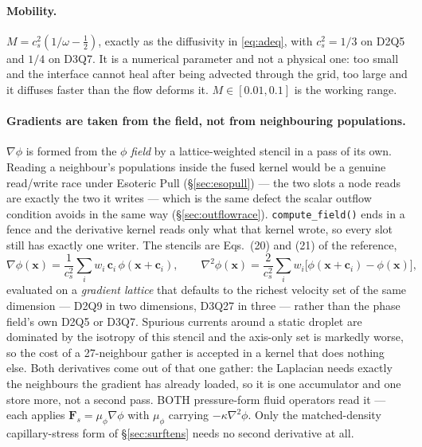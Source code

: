 \documentclass[11pt,a4paper]{article}
\newcommand{\code}[1]{\texttt{\small #1}}
\newcommand{\cs}{c_s}
\newcommand{\ci}{\bm{c}_i}
\newcommand{\xx}{\bm{x}}
\begin{document}
\paragraph{Mobility.} $M = \cs^2(1/\omega - \tfrac12)$, exactly as the
diffusivity in \eqref{eq:adeq}, with $\cs^2 = 1/3$ on D2Q5 and $1/4$ on D3Q7. It
is a numerical parameter and not a physical one: too small and the interface
cannot heal after being advected through the grid, too large and it diffuses
faster than the flow deforms it. $M\in[0.01,0.1]$ is the working range.

\paragraph{Gradients are taken from the field, not from neighbouring
populations.} $\nabla\phi$ is formed from the $\phi$ \emph{field} by a
lattice-weighted stencil in a pass of its own. Reading a neighbour's populations
inside the fused kernel would be a genuine read/write race under Esoteric Pull
(\S\ref{sec:esopull}) --- the two slots a node reads are exactly the two it
writes --- which is the same defect the scalar outflow condition avoids in the
same way (\S\ref{sec:outflowrace}). \code{compute\_field()} ends in a fence and
the derivative kernel reads only what that kernel wrote, so every slot still has
exactly one writer. The stencils are Eqs.~(20) and (21) of the reference,
\begin{equation}
  \nabla\phi(\xx) = \frac{1}{\cs^2}\sum_i w_i\,\ci\,\phi(\xx+\ci),
  \qquad
  \nabla^2\phi(\xx) = \frac{2}{\cs^2}\sum_i w_i\big[\phi(\xx+\ci)-\phi(\xx)\big],
  \label{eq:acegrad}
\end{equation}
evaluated on a \emph{gradient lattice} that defaults to the richest velocity set
of the same dimension --- D2Q9 in two dimensions, D3Q27 in three --- rather than
the phase field's own D2Q5 or D3Q7. Spurious currents around a static droplet
are dominated by the isotropy of this stencil and the axis-only set is markedly
worse, so the cost of a 27-neighbour gather is accepted in a kernel that does
nothing else. Both derivatives come out of that one gather: the Laplacian needs
exactly the neighbours the gradient has already loaded, so it is one accumulator
and one store more, not a second pass. BOTH pressure-form fluid operators read
it --- each applies $\bm{F}_s = \mu_\phi\nabla\phi$ with $\mu_\phi$ carrying
$-\kappa\nabla^2\phi$. Only the matched-density capillary-stress form of
\S\ref{sec:surftens} needs no second derivative at all.
\end{document}
